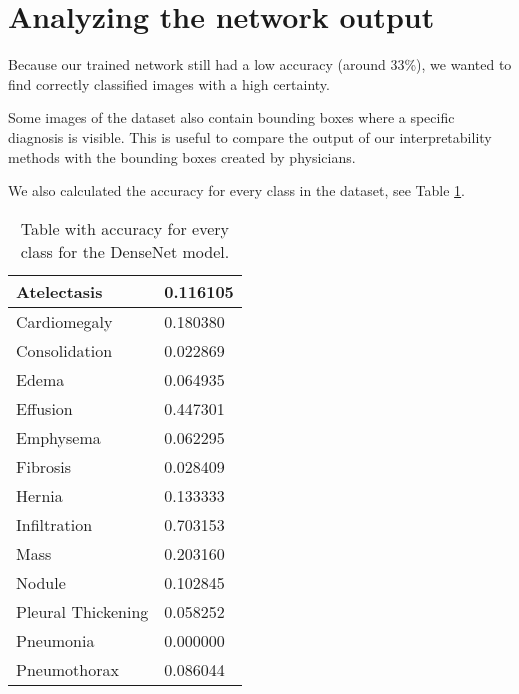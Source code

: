 
\clearpage

\section{Analyzing the network output}
Because our trained network still had a low accuracy (around 33\%), we wanted to find correctly classified images with a high certainty.

Some images of the dataset also contain bounding boxes where a specific diagnosis is visible. This is useful to compare the output
of our interpretability methods with the bounding boxes created by physicians.


We also calculated the accuracy for every class in the dataset, see Table \ref{chestxrayaccuracy}.

\begin{table}[H]
\begin{center}
\begin{tabular}{ | l | l | }
\hline
Atelectasis & 0.116105 \\ \hline
Cardiomegaly & 0.180380 \\ \hline
Consolidation & 0.022869 \\ \hline
Edema & 0.064935 \\ \hline
Effusion & 0.447301 \\ \hline
Emphysema & 0.062295 \\ \hline
Fibrosis & 0.028409 \\ \hline
Hernia & 0.133333 \\ \hline
Infiltration & 0.703153 \\ \hline
Mass & 0.203160 \\ \hline
Nodule & 0.102845 \\ \hline
Pleural Thickening & 0.058252 \\ \hline
Pneumonia & 0.000000 \\ \hline
Pneumothorax & 0.086044 \\
\hline
\end{tabular}
\caption{Table with accuracy for every class for the DenseNet model.}
\label{chestxrayaccuracy}
\end{center}
\end {table}
